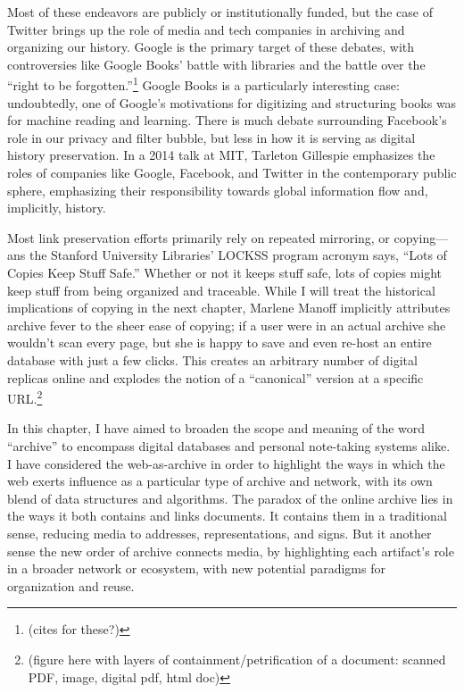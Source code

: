 
Most of these endeavors are publicly or institutionally funded, but the case of Twitter brings up the role of media and tech companies in archiving and organizing our history. Google is the primary target of these debates, with controversies like Google Books' battle with libraries and the battle over the ``right to be forgotten.''\footnote{(cites for these?)} Google Books is a particularly interesting case: undoubtedly, one of Google's motivations for digitizing and structuring books was for machine reading and learning. There is much debate surrounding Facebook's role in our privacy and filter bubble, but less in how it is serving as digital history preservation. In a 2014 talk at MIT, Tarleton Gillespie emphasizes the roles of companies like Google, Facebook, and Twitter in the contemporary public sphere, emphasizing their responsibility towards global information flow and, implicitly, history.

Most link preservation efforts primarily rely on repeated mirroring, or copying---ans the Stanford University Libraries' LOCKSS program acronym says, ``Lots of Copies Keep Stuff Safe.''\autocite{http://www.lockss.org/} Whether or not it keeps stuff safe, lots of copies might keep stuff from being organized and traceable. While I will treat the historical implications of copying in the next chapter, Marlene Manoff implicitly attributes archive fever to the sheer ease of copying; if a user were in an actual archive she wouldn’t scan every page, but she is happy to save and even re-host an entire database with just a few clicks.\autocite[386]{manoff_archive_2010} This creates an arbitrary number of digital replicas online and explodes the notion of a ``canonical'' version at a specific URL.\footnote{(figure here with layers of containment/petrification of a document: scanned PDF, image, digital pdf, html doc)}

In this chapter, I have aimed to broaden the scope and meaning of the word ``archive'' to encompass digital databases and personal note-taking systems alike. I have considered the web-as-archive in order to highlight the ways in which the web exerts influence as a particular type of archive and network, with its own blend of data structures and algorithms. The paradox of the online archive lies in the ways it both contains and links documents. It contains them in a traditional sense, reducing media to addresses, representations, and signs. But it another sense the new order of archive connects media, by highlighting each artifact's role in a broader network or ecosystem, with new potential paradigms for organization and reuse.
